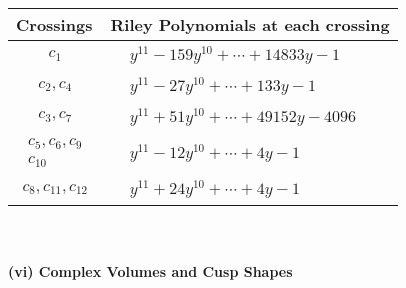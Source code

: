 \documentclass[1p]{elsarticle_modified}
\theoremstyle{definition}
\begin{document}
\begin{tabular}{m{50pt}|m{274pt}}
Crossings & \hspace{64pt}Riley Polynomials at each crossing \\
\hline $$\begin{aligned}c_{1}\end{aligned}$$&$\begin{aligned}
&y^{11}-159 y^{10}+\cdots+14833 y-1
\end{aligned}$\\
\hline $$\begin{aligned}c_{2},c_{4}\end{aligned}$$&$\begin{aligned}
&y^{11}-27 y^{10}+\cdots+133 y-1
\end{aligned}$\\
\hline $$\begin{aligned}c_{3},c_{7}\end{aligned}$$&$\begin{aligned}
&y^{11}+51 y^{10}+\cdots+49152 y-4096
\end{aligned}$\\
\hline $$\begin{aligned}c_{5},c_{6},c_{9}\\c_{10}\end{aligned}$$&$\begin{aligned}
&y^{11}-12 y^{10}+\cdots+4 y-1
\end{aligned}$\\
\hline $$\begin{aligned}c_{8},c_{11},c_{12}\end{aligned}$$&$\begin{aligned}
&y^{11}+24 y^{10}+\cdots+4 y-1
\end{aligned}$\\
\hline
\end{tabular}\\~\\
\newpage\flushleft \textbf{(vi) Complex Volumes and Cusp Shapes}
\end{document}
